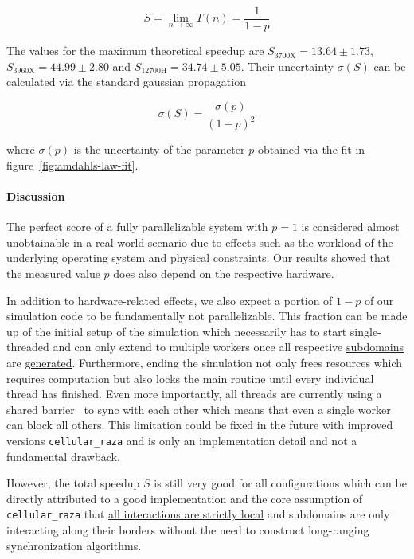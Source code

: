 \documentclass[fontsize=11pt,a4paper]{article}
\begin{document}
\begin{equation}
    S = \lim\limits_{n\rightarrow\infty} T(n) = \frac{1}{1-p}
    \label{eq:amdahls-law-maximum-speedup}
\end{equation}

The values for the maximum theoretical speedup are $S_\text{3700X}=13.64\pm1.73$,
$S_\text{3960X}=44.99\pm2.80$ and $S_\text{12700H}=34.74\pm5.05$.
Their uncertainty $\sigma(S)$ can be calculated via the standard gaussian propagation

\begin{equation}
    \sigma(S) = \frac{\sigma(p)}{(1-p)^2}
\end{equation}

where $\sigma(p)$ is the uncertainty of the parameter $p$ obtained via the fit in
figure~\ref{fig:amdahls-law-fit}.

\paragraph{Discussion}
The perfect score of a fully parallelizable system with $p=1$ is considered almost unobtainable
in a real-world scenario due to effects such as the workload of the underlying operating system
and physical constraints.
Our results showed that the measured value $p$ does also depend on the respective hardware.

In addition to hardware-related effects, we also expect a portion of $1-p$ of our simulation code
to be fundamentally not parallelizable.
This fraction can be made up of the initial setup of the simulation which necessarily has to start
single-threaded and can only extend to multiple workers once all respective
\href{https://cellular-raza.com/docs/cellular_raza_core/backend/chili/struct.SubDomainBox.html}
{subdomains} are
\href{https://cellular-raza.com/docs/cellular_raza_concepts/trait.Domain.html}{generated}.
Furthermore, ending the simulation not only frees resources which requires computation but also
locks the main routine until every individual thread has finished.
Even more importantly, all threads are currently using a shared barrier~\cite{GjengsetHurdles2018}
to sync with each other which means that even a single worker can block all others.
This limitation could be fixed in the future with improved versions \texttt{cellular\_raza} and is
only an implementation detail and not a fundamental drawback.

However, the total speedup $S$ is still very good for all configurations which can be directly
attributed to a good implementation and the core assumption of \texttt{cellular\_raza} that
\href{https://cellular-raza.com/guides/introduction/#local-rules}
{all interactions are strictly local} and subdomains are only interacting along their borders
without the need to construct long-ranging synchronization algorithms.
\end{document}
